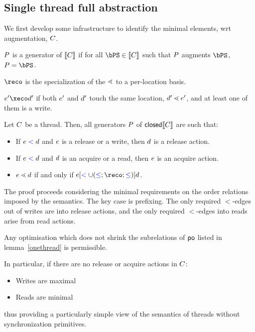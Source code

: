 \subsection{Single thread full abstraction}
We first develop some infrastructure to identify the minimal elements, wrt augmentation, $C$.  
\begin{definition}
$P$ is a generator of  $\llbracket C\rrbracket$ if for all $\bPS \in \sem{\aCmd}$ such that $P$ augments $\bPS$, $\aPS = \bPS$.
\end{definition}

$\reco$ is the specialization of the $\lessdot$ to a per-location basis.  
\begin{definition}
 $ \aEv' \xeco  \bEv'$ if both $e'$ and $d'$ touch the same location, $d' \lessdot e'$, and at least one of them is a write.  
\end{definition}

\begin{lemma}\label{onethread}
Let $C$ be a thread.  Then, all generators $P$ of  $\textsf{closed}\llbracket C\rrbracket$  are such that:
\begin{itemize}
\item  If $e\mathrel{{\color{blue}<}}d$ and $e$ is a release or a write, then $d$ is a release action.
\item  If $e\mathrel{{\color{blue}<}}d$ and $d$ is an acquire or a read, then $e$ is an acquire action.
 \item  $e \lessdot d$ if and only if $ \aEv [\lt \cup (\le; \reco; 
\le)] \bEv$. 
\end{itemize}
\end{lemma}
The proof proceeds considering the minimal requirements on the order relations imposed by the semantics.  The key case is prefixing.  The only required $\lt$-edges out of writes are into release actions, and the only required $\lt$-edges into reads arise from read actions. 

Any optimisation which does not shrink the subrelations of $\mathrel{\mathsf{po}}$ listed in lemma~\ref{onethread} is permissible.  







In particular, if there are no release or acquire actions in $C$:
\begin{itemize}
\item Writes are maximal
\item Reads are minimal
\end{itemize}
thus providing a particularly simple view of the semantics of threads without synchronization primitives.   